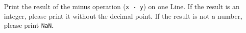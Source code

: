 Print the result of the minus operation (\verb|x - y|) on one Line.
If the result is an integer, please print it without the decimal point.
If the result is not a number, please print \verb+NaN+.
